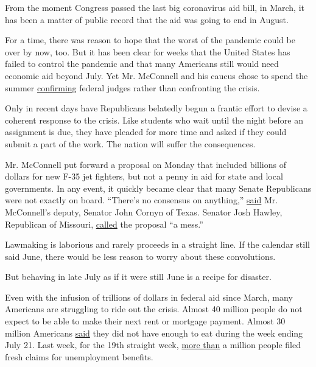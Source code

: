 From the moment Congress passed the last big coronavirus aid bill, in
March, it has been a matter of public record that the aid was going to
end in August.

For a time, there was reason to hope that the worst of the pandemic
could be over by now, too. But it has been clear for weeks that the
United States has failed to control the pandemic and that many Americans
still would need economic aid beyond July. Yet Mr. McConnell and his
caucus chose to spend the summer
\href{https://news.ballotpedia.org/2020/07/29/u-s-senate-confirms-hardy-to-u-s-district-court-for-the-western-district-of-pennsylvania/}{confirming}
federal judges rather than confronting the crisis.

Only in recent days have Republicans belatedly begun a frantic effort to
devise a coherent response to the crisis. Like students who wait until
the night before an assignment is due, they have pleaded for more time
and asked if they could submit a part of the work. The nation will
suffer the consequences.

Mr. McConnell put forward a proposal on Monday that included billions of
dollars for new F-35 jet fighters, but not a penny in aid for state and
local governments. In any event, it quickly became clear that many
Senate Republicans were not exactly on board. ``There's no consensus on
anything,''
\href{https://www.washingtonpost.com/us-policy/2020/07/29/trump-pushes-short-term-fix-unemployment-insurance-eviction-moratorium/}{said}
Mr. McConnell's deputy, Senator John Cornyn of Texas. Senator Josh
Hawley, Republican of Missouri,
\href{https://twitter.com/alexanderbolton/status/1288177098839003136}{called}
the proposal ``a mess.''

Lawmaking is laborious and rarely proceeds in a straight line. If the
calendar still said June, there would be less reason to worry about
these convolutions.

But behaving in late July as if it were still June is a recipe for
disaster.

Even with the infusion of trillions of dollars in federal aid since
March, many Americans are struggling to ride out the crisis. Almost 40
million people do not expect to be able to make their next rent or
mortgage payment. Almost 30 million Americans
\href{https://www.bloomberg.com/news/articles/2020-07-29/almost-30-million-in-u-s-didn-t-have-enough-to-eat-last-week\#:~:text=Food\%20insecurity\%20for\%20U.S.\%20households,seven\%20days\%20through\%20July\%2021.}{said}
they did not have enough to eat during the week ending July 21. Last
week, for the 19th straight week,
\href{https://www.washingtonpost.com/business/2020/07/09/another-13-million-people-applied-new-jobless-benefits-last-week-pandemics-toll-economy-continued/}{more
than} a million people filed fresh claims for unemployment benefits.

